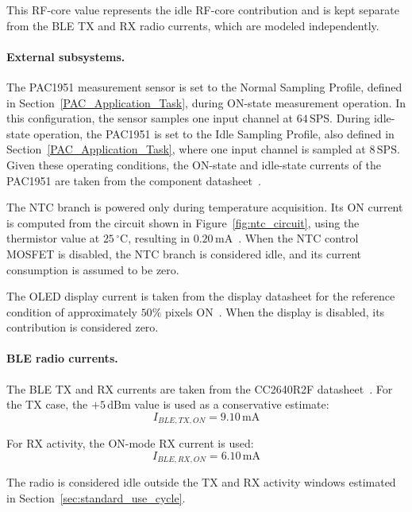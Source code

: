 This RF-core value represents the idle RF-core contribution and is kept separate from the BLE TX and RX radio currents, which are modeled independently.



\paragraph{External subsystems.}
The PAC1951 measurement sensor is set to the Normal Sampling Profile, defined in Section~\ref{PAC_Application_Task}, during ON-state measurement operation. 
In this configuration, the sensor samples one input channel at \(64\,\mathrm{SPS}\). 
During idle-state operation, the PAC1951 is set to the Idle Sampling Profile, also defined in Section~\ref{PAC_Application_Task}, where one input channel is sampled at \(8\,\mathrm{SPS}\). 
Given these operating conditions, the ON-state and idle-state currents of the PAC1951 are taken from the component datasheet~\cite{pac1951_datasheet}.

The NTC branch is powered only during temperature acquisition. 
Its ON current is computed from the circuit shown in Figure~\ref{fig:ntc_circuit}, using the thermistor value at \(25\,^\circ\mathrm{C}\), resulting in \(0.20\,\mathrm{mA}\)~\cite{ntc_datasheet}. 
When the NTC control MOSFET is disabled, the NTC branch is considered idle, and its current consumption is assumed to be zero.

The OLED display current is taken from the display datasheet for the reference condition of approximately \(50\%\) pixels ON~\cite{oled_datasheet}. 
When the display is disabled, its contribution is considered zero.

\paragraph{BLE radio currents.}
The BLE TX and RX currents are taken from the CC2640R2F datasheet~\cite{mcu_datasheet}. 
For the TX case, the \(+5\,\mathrm{dBm}\) value is used as a conservative estimate:
\begin{equation}
	I_{BLE,TX,ON} = 9.10\,\mathrm{mA}
\end{equation}

For RX activity, the ON-mode RX current is used:
\begin{equation}
	I_{BLE,RX,ON} = 6.10\,\mathrm{mA}
\end{equation}

The radio is considered idle outside the TX and RX activity windows estimated in Section~\ref{sec:standard_use_cycle}.

